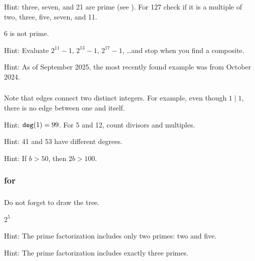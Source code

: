 \subsubsection*{ \answers}
\begin{apart}
    \item Hint: three, seven, and 21 are prime (see ).  For 127 check if it is a multiple of two, three, five, seven, and 11.
    \item 6 is not prime.
    \item Hint: Evaluate $2^{11}-1$, $2^{13}-1$, $2^{17}-1$, \ldots and stop when you find a composite.
    \item Hint: As of September 2025, the most recently found example was from October 2024.
\end{apart}

\subsubsection*{ \answers}
    Note that edges connect two distinct integers. For example, even though $1 \mid 1$, there is no edge between one and itself.
        \begin{apart}
            \item Hint: $\texttt{deg}(1)=99$.  For 5 and 12, count divisors and multiples.
            \item Hint: 41 and 53 have different degrees.
            \item Hint: If $b>50$, then $2b >100$.
        \end{apart}

\subsubsection{\answers for  \subprimefact}

\subsubsection*{ \answers}
    Do not forget to draw the tree.
        \begin{apart}
            \item $2^5$
            \item Hint: The prime factorization includes only two primes: two and five.
            \item Hint: The prime factorization includes exactly three primes.
        \end{apart}


